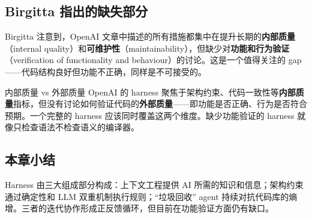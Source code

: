 \subsection{Birgitta 指出的缺失部分}

Birgitta 注意到，OpenAI 文章中描述的所有措施都集中在提升长期的\textbf{内部质量}（internal quality）和\textbf{可维护性}（maintainability），但缺少对\textbf{功能和行为验证}（verification of functionality and behaviour）的讨论。这是一个值得关注的 gap------代码结构良好但功能不正确，同样是不可接受的。

\begin{warningbox}{内部质量 vs 外部质量}
OpenAI 的 harness 聚焦于架构约束、代码一致性等\textbf{内部质量}指标，但没有讨论如何验证代码的\textbf{外部质量}------即功能是否正确、行为是否符合预期。一个完整的 harness 应该同时覆盖这两个维度。缺少功能验证的 harness 就像只检查语法不检查语义的编译器。
\end{warningbox}

\subsection{本章小结}

Harness 由三大组成部分构成：上下文工程提供 AI 所需的知识和信息；架构约束通过确定性和 LLM 双重机制执行规则；``垃圾回收'' agent 持续对抗代码库的熵增。三者的迭代协作形成正反馈循环，但目前在功能验证方面仍有缺口。

\newpage

